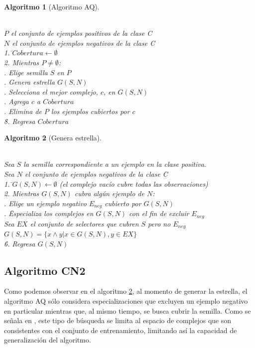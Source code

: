 \documentclass[12pt]{report}
\theoremstyle{break}
\theoremstyle{break}
\newtheorem{algoritmo}{Algoritmo}[chapter]
\begin{document}
\begin{algoritmo}[Algoritmo AQ]
\begin{tabbing}
\\$P$ el conjunto de ejemplos positivos de la clase C
\\$N$ el conjunto de ejemplos negativos de la clase C\\
1. \=$Cobertura\leftarrow \emptyset $ \\
2. Mientras $P \neq \emptyset$:\\
 . Elige semilla $S$ en $P$\\
 . Genera estrella $G(S,N)$\\
 . Selecciona el mejor complejo, $c$, en $G(S,N)$\\
 . Agrega $c$ a $Cobertura$\\
 . Elimina de $P$ los ejemplos cubiertos por $c$\\
\=8. Regresa $Cobertura$
\end{tabbing}
\label{algo:AQ}
\end{algoritmo}

\begin{algoritmo}[Genera estrella]
\begin{tabbing}
\\Sea $S$ la semilla correspondiente a un ejemplo en la clase positiva.
\\Sea $N$ el conjunto de ejemplos negativos de la clase C\\
1. \=$G(S,N)\leftarrow \emptyset$ (el complejo vacío cubre todas las observaciones) \\
2. Mientras $G(S,N)$ cubra algún ejemplo de $N$:\\
 . Elige un ejemplo negativo $E_{neg}$ cubierto por $G(S,N)$\\
 . \= Especializa los complejos en $G(S,N)$ con el fin de excluir $E_{neg}$\\
 \> Sea $EX$ el conjunto de selectores que cubren $S$ pero no $E_{neg}$ \\
 \> $G(S,N)=\{x \wedge y \vert x \in G(S,N), y \in EX \}$\\
\=6. Regresa $G(S,N)$
\end{tabbing}
\label{algo:AQ genera estrella}
\end{algoritmo}

\subsection{Algoritmo CN2}
\label{subseccion:algoritmo cn2}
Como podemos observar en el algoritmo \ref{algo:AQ genera estrella}, al momento de generar la estrella, el algoritmo AQ sólo considera especializaciones que excluyen un ejemplo negativo en particular mientras que, al mismo tiempo, se busca cubrir la semilla. Como se señala en \cite{CN2-Clark1989}, este tipo de búsqueda se limita al espacio de complejos que son consistentes con el conjunto de entrenamiento, limitando así la capacidad de generalización del algoritmo.
\end{document}
